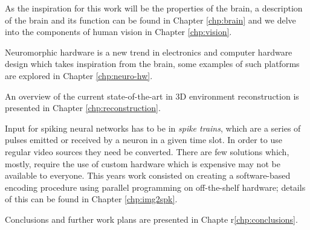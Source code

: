 As the inspiration for this work will be the properties of the brain, a description of the brain and its function can be found in Chapter \ref{chp:brain} and we delve into the components of human vision in Chapter \ref{chp:vision}.  

Neuromorphic hardware is a new trend in electronics and computer hardware design which takes inspiration from the brain, some examples of such platforms are explored in Chapter \ref{chp:neuro-hw}.

An overview of the current state-of-the-art in 3D environment reconstruction is presented in Chapter \ref{chp:reconstruction}.

Input for spiking neural networks has to be in \emph{spike trains}, which are a series of pulses emitted or received by a neuron in a given time slot. In order to use regular video sources they need be converted. There are few solutions which, mostly, require the use of custom hardware which is expensive may not be available to everyone. This years work consisted on creating a software-based encoding procedure using parallel programming on off-the-shelf hardware; details of this can be found in Chapter \ref{chp:img2spk}. 

Conclusions and further work plans are presented in Chapte r\ref{chp:conclusions}.